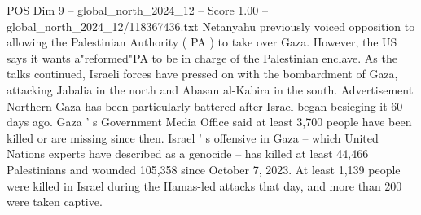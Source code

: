 \begin{textsample}{POS Dim 9 – global\_north\_2024\_12 – Score 1.00 – global\_north\_2024\_12/118367436.txt}
Netanyahu previously voiced opposition to allowing the Palestinian Authority ( PA ) to take over Gaza.
However, the US says it wants a"reformed"PA to be in charge of the Palestinian enclave.
As the talks continued, Israeli forces have pressed on with the bombardment of Gaza, attacking Jabalia in the north and Abasan al-Kabira in the south.
Advertisement Northern Gaza has been particularly battered after Israel began besieging it 60 days ago.
Gaza ' s Government Media Office said at least 3,700 people have been killed or are missing since then.
Israel ' s offensive in Gaza -- which United Nations experts have described as a genocide -- has killed at least 44,466 Palestinians and wounded 105,358 since October 7, 2023.
At least 1,139 people were killed in Israel during the Hamas-led attacks that day, and more than 200 were taken captive.

\end{textsample}
